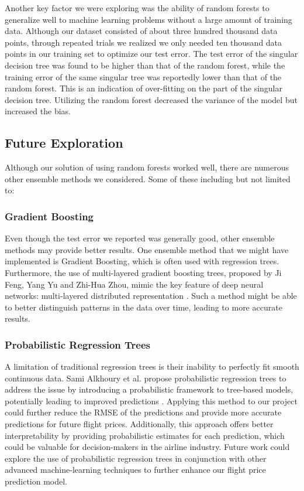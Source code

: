 \documentclass{article}
\begin{document}
Another key factor we were exploring was the ability of random forests to generalize well to machine learning problems without a large amount of training data. Although our dataset consisted of about three hundred thousand data points, through repeated trials we realized we only needed ten thousand data points in our training set to optimize our test error. The test error of the singular decision tree was found to be higher than that of the random forest, while the training error of the same singular tree was reportedly lower than that of the random forest. This is an indication of over-fitting on the part of the singular decision tree. Utilizing the random forest decreased the variance of the model but increased the bias.

\subsection{Future Exploration}

Although our solution of using random forests worked well, there are numerous other ensemble methods we considered. Some of these including but not limited to:

\subsubsection{Gradient Boosting}

Even though the test error we reported was generally good, other ensemble methods may provide better results. One ensemble method that we might have implemented is Gradient Boosting, which is often used with regression trees. Furthermore, the use of multi-layered gradient boosting trees, proposed by Ji Feng, Yang Yu and Zhi-Hua Zhou, mimic the key feature of deep neural networks: multi-layered distributed representation \cite{Feng}. Such a method might be able to better distinguish patterns in the data over time, leading to more accurate results.

\subsubsection{Probabilistic Regression Trees}

A limitation of traditional regression trees is their inability to perfectly fit smooth continuous data. Sami Alkhoury et al. propose probabilistic regression trees to address the issue by introducing a probabilistic framework to tree-based models, potentially leading to improved predictions \cite{Alkhoury}. Applying this method to our project could further reduce the RMSE of the predictions and provide more accurate predictions for future flight prices. Additionally, this approach offers better interpretability by providing probabilistic estimates for each prediction, which could be valuable for decision-makers in the airline industry. Future work could explore the use of probabilistic regression trees in conjunction with other advanced machine-learning techniques to further enhance our flight price prediction model.
\end{document}
